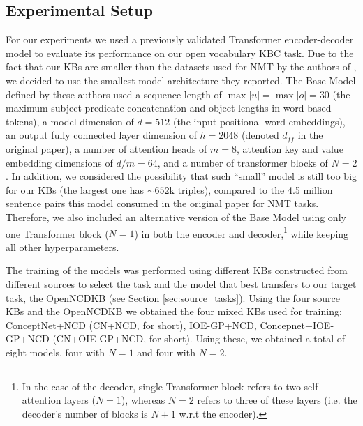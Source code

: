 \documentclass[preprint]{elsarticle}
\begin{document}
\subsection{Experimental Setup}
For our experiments we used a previously validated Transformer encoder-decoder model to evaluate its performance on our open vocabulary KBC task. Due to the fact that our KBs are smaller than the datasets used for NMT by the authors of \cite{vaswani2017attention}, we decided to use the smallest model architecture they reported. The Base Model defined by these authors used a sequence length of $\max|u|=\max|o|=30$ (the maximum subject-predicate concatenation and object lengths in word-based tokens), a model dimension of $d=512$ (the input positional word embeddings), an output fully connected layer dimension of $h=2048$ (denoted $d_{ff}$ in the original paper), a number of attention heads of $m=8$, attention key and value embedding dimensions of $d/m=64$, and a number of transformer blocks of $N=2$. In addition, we considered the possibility that such ``small'' model is still too big for our KBs (the largest one has $\sim 652$k triples), compared to the 4.5 million sentence pairs this model consumed in the original paper for NMT tasks. Therefore, we also included an alternative version of the Base Model using only one Transformer block ($N=1$) in both the encoder and decoder,\footnote{In the case of the decoder, single Transformer block refers to two self-attention layers ($N=1$), whereas $N=2$ refers to three of these layers (i.e. the decoder's number of blocks is $N+1$ w.r.t the encoder).} while keeping all other hyperparameters.

The training of the models was performed using different KBs constructed from different sources to select the task  and the model that best transfers to our target task, the OpenNCDKB (see Section \ref{sec:source_tasks}). Using the four source KBs and the OpenNCDKB we obtained the four mixed KBs used for training: ConceptNet+NCD (CN+NCD, for short), IOE-GP+NCD, Concepnet+IOE-GP+NCD (CN+OIE-GP+NCD, for short). Using these, we obtained a total of eight models, four with $N=1$ and four with $N=2$.
\end{document}
